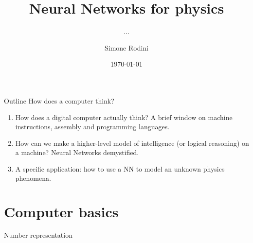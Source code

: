 \documentclass[10pt]{beamer}
\title{Neural Networks for physics}
\subtitle{...}
\author[S. Rodini]{Simone Rodini}
\date[\today]{\today}
\renewcommand{\[}{\begin{equation}}
\renewcommand{\]}{\end{equation}}
\begin{document}
\frame{\titlepage}
\section{}
\begin{frame}{Outline}
How does a computer think? 
\begin{enumerate}
\item How does a digital computer actually think? A brief window on machine instructions, assembly and programming languages.
\item How can we make a higher-level model of intelligence (or logical reasoning) on a machine? Neural Networks demystified.
\item A specific application: how to use a NN to model an unknown physics phenomena.
\end{enumerate}
\end{frame}

\section{Computer basics}

\begin{frame}{Number representation}

\end{frame}





\end{document}
